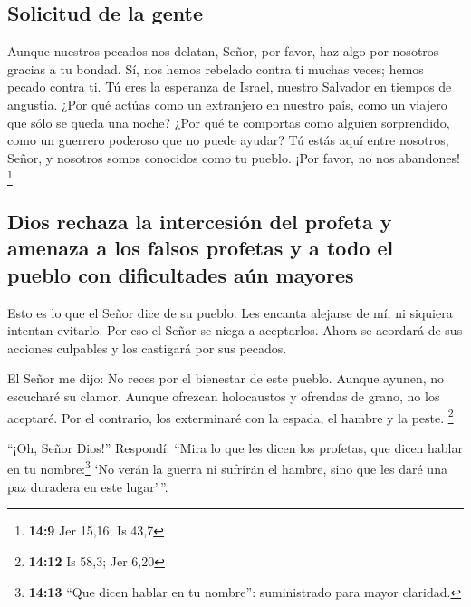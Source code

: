 \hypertarget{solicitud-de-la-gente}{%
\subsection{Solicitud de la gente}\label{solicitud-de-la-gente}}

 Aunque nuestros pecados nos delatan, Señor, por favor,
haz algo por nosotros gracias a tu bondad. Sí, nos hemos rebelado contra
ti muchas veces; hemos pecado contra ti.  Tú eres la
esperanza de Israel, nuestro Salvador en tiempos de angustia. ¿Por qué
actúas como un extranjero en nuestro país, como un viajero que sólo se
queda una noche?  ¿Por qué te comportas como alguien
sorprendido, como un guerrero poderoso que no puede ayudar? Tú estás
aquí entre nosotros, Señor, y nosotros somos conocidos como tu pueblo.
¡Por favor, no nos abandones! \footnote{\textbf{14:9} Jer 15,16; Is 43,7}

\hypertarget{dios-rechaza-la-intercesiuxf3n-del-profeta-y-amenaza-a-los-falsos-profetas-y-a-todo-el-pueblo-con-dificultades-auxfan-mayores}{%
\subsection{Dios rechaza la intercesión del profeta y amenaza a los
falsos profetas y a todo el pueblo con dificultades aún
mayores}\label{dios-rechaza-la-intercesiuxf3n-del-profeta-y-amenaza-a-los-falsos-profetas-y-a-todo-el-pueblo-con-dificultades-auxfan-mayores}}

 Esto es lo que el Señor dice de su pueblo: Les encanta
alejarse de mí; ni siquiera intentan evitarlo. Por eso el Señor se niega
a aceptarlos. Ahora se acordará de sus acciones culpables y los
castigará por sus pecados.

 El Señor me dijo: No reces por el bienestar de este
pueblo.  Aunque ayunen, no escucharé su clamor. Aunque
ofrezcan holocaustos y ofrendas de grano, no los aceptaré. Por el
contrario, los exterminaré con la espada, el hambre y la peste.
\footnote{\textbf{14:12} Is 58,3; Jer 6,20}

 ``¡Oh, Señor Dios!'' Respondí: ``Mira lo que les dicen
los profetas, que dicen hablar en tu nombre:\footnote{\textbf{14:13}
  ``Que dicen hablar en tu nombre'': suministrado para mayor claridad.}
`No verán la guerra ni sufrirán el hambre, sino que les daré una paz
duradera en este lugar'\,''.

